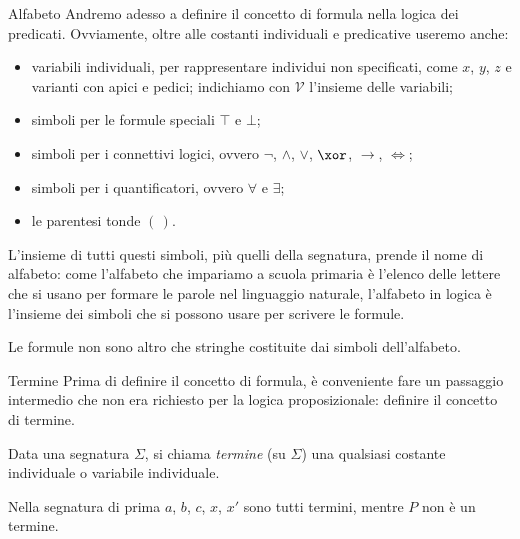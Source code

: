 \documentclass[aspectratio=169,10pt,dvipsnames,xcolor=table,handout]{beamer}
\begin{document}
\begin{frame}{Alfabeto}
    Andremo adesso a definire il concetto di formula nella logica dei predicati. Ovviamente, oltre alle costanti individuali e predicative useremo anche:
    \begin{itemize}
        \item variabili individuali, per rappresentare individui non specificati, come $x$, $y$, $z$ e varianti con apici e pedici; indichiamo con $\mathcal V$ l'insieme delle variabili;
        \item simboli per le formule speciali $\top$ e $\bot$;
        \item simboli per i connettivi logici, ovvero $\neg$, $\land$, $\lor$, $\xor$, $\to$, $\iff$;
        \item simboli per i quantificatori, ovvero $\forall$ e $\exists$;
        \item le parentesi tonde $(\,)$.
    \end{itemize}
    L'insieme di tutti questi simboli, più quelli della segnatura, prende il nome di \alert{alfabeto}: come l'alfabeto che impariamo a scuola primaria è l'elenco delle lettere che si usano per formare le parole nel linguaggio naturale, l'alfabeto in logica è l'insieme dei simboli che si possono usare per scrivere le formule.

    \medskip
    Le formule non sono altro che stringhe costituite dai simboli dell'alfabeto.
\end{frame}

\begin{frame}{Termine}
    Prima di definire il concetto di formula, è conveniente fare un passaggio intermedio che non era richiesto per la logica proposizionale: definire il concetto di \alert{termine}.
    \begin{definition}[Termine]
        Data una segnatura $\Sigma$, si chiama \emph{termine} (su $\Sigma$) una qualsiasi costante individuale o variabile individuale.
    \end{definition}

    \pause
    \begin{example}
        Nella segnatura di prima $a$, $b$, $c$, $x$, $x'$ sono tutti termini, mentre $P$ non è un termine.
    \end{example}

\end{frame}
\end{document}
